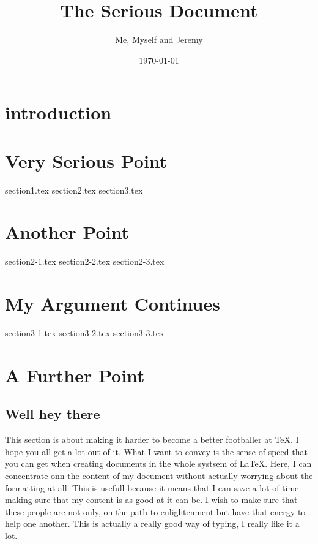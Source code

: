\documentclass[a4paper]{report}
\title{The Serious Document}
\author{Me, Myself and Jeremy}
\date{\today}
\begin{document}
\maketitle

\pagebreak

\begin{abstract}

\end{abstract}

\chapter{introduction}


\chapter{Very Serious Point}
{section1.tex}
{section2.tex}
{section3.tex}

\chapter{Another Point}
{section2-1.tex}
{section2-2.tex}
{section2-3.tex}

\chapter{My Argument Continues}
{section3-1.tex}
{section3-2.tex}
{section3-3.tex}

\chapter{A Further Point}
\section{Well hey there}
This section is about making it harder to become a better footballer at \TeX. I hope you all get a lot out of it. What I want to convey is the sense of speed that you can get when creating documents in the whole systsem of \LaTeX. Here, I can concentrate onn the content of my document without actually worrying about the formatting at all. This is usefull because it means that I can save a lot of time making sure that my content is as good at it can be. I wish to make sure that these people are not only, on the path to enlightenment but have that energy to help one another. This is actually a really good way of typing, I really like it a lot. 
\end{document}
